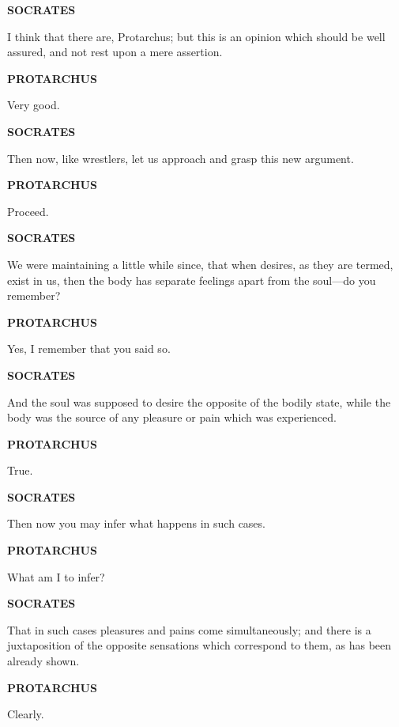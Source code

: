 \documentclass[11pt,letter]{article}
\begin{document}
\par \textbf{SOCRATES}
\par   I think that there are, Protarchus; but this is an opinion which should be well assured, and not rest upon a mere assertion.

\par \textbf{PROTARCHUS}
\par   Very good.

\par \textbf{SOCRATES}
\par   Then now, like wrestlers, let us approach and grasp this new argument.

\par \textbf{PROTARCHUS}
\par   Proceed.

\par \textbf{SOCRATES}
\par   We were maintaining a little while since, that when desires, as they are termed, exist in us, then the body has separate feelings apart from the soul—do you remember?

\par \textbf{PROTARCHUS}
\par   Yes, I remember that you said so.

\par \textbf{SOCRATES}
\par   And the soul was supposed to desire the opposite of the bodily state, while the body was the source of any pleasure or pain which was experienced.

\par \textbf{PROTARCHUS}
\par   True.

\par \textbf{SOCRATES}
\par   Then now you may infer what happens in such cases.

\par \textbf{PROTARCHUS}
\par   What am I to infer?

\par \textbf{SOCRATES}
\par   That in such cases pleasures and pains come simultaneously; and there is a juxtaposition of the opposite sensations which correspond to them, as has been already shown.

\par \textbf{PROTARCHUS}
\par   Clearly.
\end{document}
